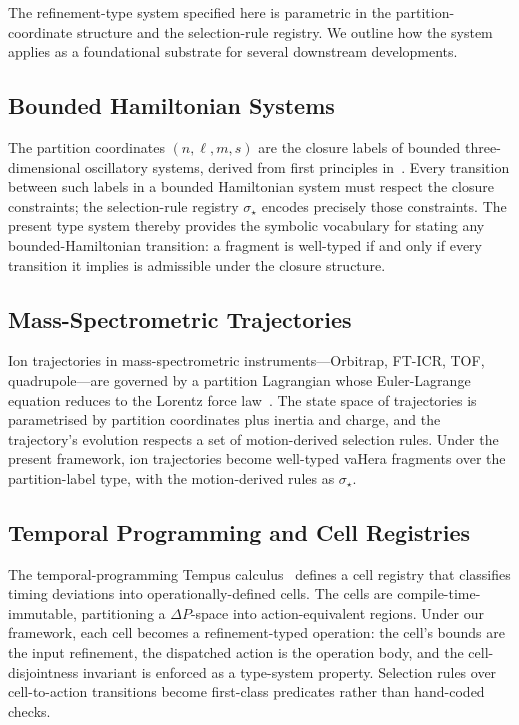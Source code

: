 \documentclass[twocolumn,11pt,a4paper]{article}
\newcommand{\Sel}{\sigma}
\begin{document}
The refinement-type system specified here is parametric in the partition-coordinate structure and the selection-rule registry. We outline how the system applies as a foundational substrate for several downstream developments.

\subsection{Bounded Hamiltonian Systems}

The partition coordinates $(n, \ell, m, s)$ are the closure labels of bounded three-dimensional oscillatory systems, derived from first principles in~\citet{sachikonye2026bpst}. Every transition between such labels in a bounded Hamiltonian system must respect the closure constraints; the selection-rule registry $\Sel_\star$ encodes precisely those constraints. The present type system thereby provides the symbolic vocabulary for stating any bounded-Hamiltonian transition: a fragment is well-typed if and only if every transition it implies is admissible under the closure structure.

\subsection{Mass-Spectrometric Trajectories}

Ion trajectories in mass-spectrometric instruments---Orbitrap, FT-ICR, TOF, quadrupole---are governed by a partition Lagrangian whose Euler-Lagrange equation reduces to the Lorentz force law~\citep{sachikonye2026ion}. The state space of trajectories is parametrised by partition coordinates plus inertia and charge, and the trajectory's evolution respects a set of motion-derived selection rules. Under the present framework, ion trajectories become well-typed vaHera fragments over the partition-label type, with the motion-derived rules as $\Sel_\star$.

\subsection{Temporal Programming and Cell Registries}

The temporal-programming Tempus calculus~\citep{sachikonye2026temporal} defines a cell registry that classifies timing deviations into operationally-defined cells. The cells are compile-time-immutable, partitioning a $\Delta P$-space into action-equivalent regions. Under our framework, each cell becomes a refinement-typed operation: the cell's bounds are the input refinement, the dispatched action is the operation body, and the cell-disjointness invariant is enforced as a type-system property. Selection rules over cell-to-action transitions become first-class predicates rather than hand-coded checks.
\end{document}
